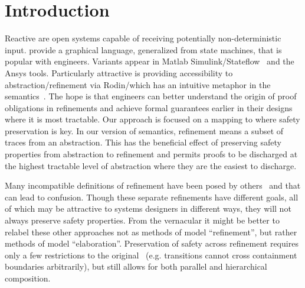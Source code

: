 

\section{Introduction}
\label{sec:intro}

Reactive \SCs are open systems capable of receiving potentially non-deterministic input. 
\SCs provide a graphical language, generalized from state machines, that is popular with engineers.
Variants appear in Matlab Simulink/Stateflow~\cite{MATLAB:2019} and the Ansys tools.  
Particularly attractive is providing accessibility to abstraction/refinement via Rodin/\EventB which has an intuitive metaphor in the \SC semantics~\cite{MoSnHo18,MoSnHo-ABZ2020,detect2020}.  
The hope is that engineers can better understand the origin of proof obligations in refinements and achieve formal guarantees earlier in their designs where it is most tractable.
Our approach is focused on a mapping to \EventB where safety preservation is key.  
In our version of \SC semantics, refinement means a subset of traces from an abstraction. 
This has the beneficial effect of preserving safety properties from abstraction to refinement and permits proofs to be discharged at the highest tractable level of abstraction where they are the easiest to discharge.

Many incompatible definitions of refinement have been posed by others~\cite{Syriani_2019,Maraninchi91theargos} and that can lead to confusion.  
Though these separate refinements have different goals, all of which may be attractive to systems designers in different ways,
they will not always preserve safety properties.  
From the \EventB vernacular it might be better to relabel these other approaches not as methods of model ``refinement'', but rather methods of model ``elaboration''.  
Preservation of safety across refinement requires only a few restrictions to the original~\cite{Harel} \SCs (e.g. transitions cannot cross containment boundaries arbitrarily), but still allows for both parallel and hierarchical composition. 


